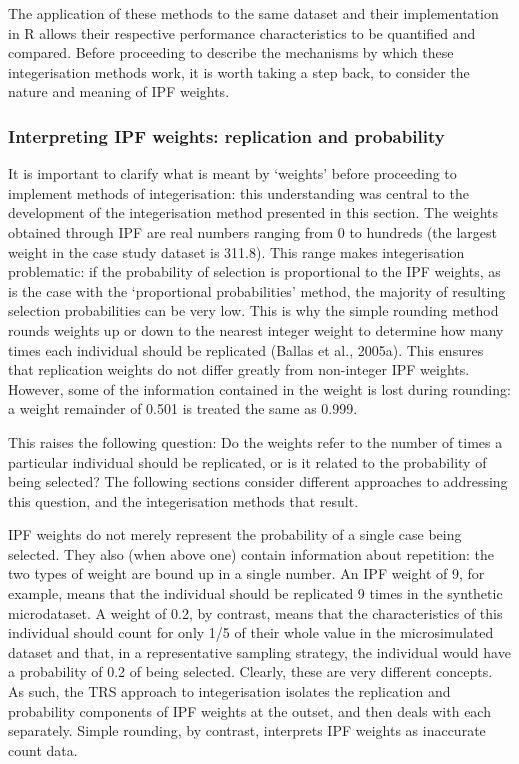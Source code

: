 \documentclass[a4paper, 11pt, twoside]{Thesis}
\begin{document}
The application of these methods to the same dataset and their implementation in R allows
their respective performance characteristics to be quantified and compared.
Before proceeding to describe the mechanisms by which these integerisation
methods work, it is worth taking a step back, to consider the nature and
meaning of IPF weights.

\subsubsection{Interpreting IPF weights: replication and probability}
It is important to clarify what is meant by `weights' before proceeding to
implement methods of integerisation: this understanding was central to the
development of the integerisation method presented in this section.
The weights obtained through IPF are real numbers ranging from 0 to hundreds
(the largest weight in the case study dataset is 311.8). This range
makes integerisation problematic: if the probability of selection is
proportional to the IPF weights, as is the case with the `proportional
probabilities' method,
the majority of resulting selection probabilities can be very low.
This is why the simple rounding method rounds weights up or down to the nearest
integer weight to determine how many times each individual should be
replicated (Ballas et al., 2005a). This ensures that replication weights do not differ
greatly from non-integer IPF weights. However, some of the information contained
in the weight is lost during rounding: a weight remainder of 0.501 is treated
the same as 0.999.

This raises the following question: Do the weights refer to the number of times
a particular individual should be replicated, or is it related to the
probability of being selected? The following sections
consider different approaches to addressing this question, and the
integerisation methods that result.


IPF weights do not merely represent the probability of a single case
being selected. They also (when above one) contain information about
repetition: the two types of weight are bound up in a single number. An
IPF weight of 9, for example, means that the individual should be replicated
9 times in the synthetic microdataset. A weight of 0.2, by contrast, means
that the characteristics of this individual should count for only 1/5 of their
whole value in the microsimulated dataset and that, in a representative
sampling strategy, the individual would have a probability of 0.2 of being
selected. Clearly, these are very different concepts. As such, the TRS approach
to integerisation isolates
the replication and probability components of IPF weights at the outset, and
then deals with each separately. Simple rounding, by contrast, interprets IPF
weights as inaccurate count data.
\end{document}
